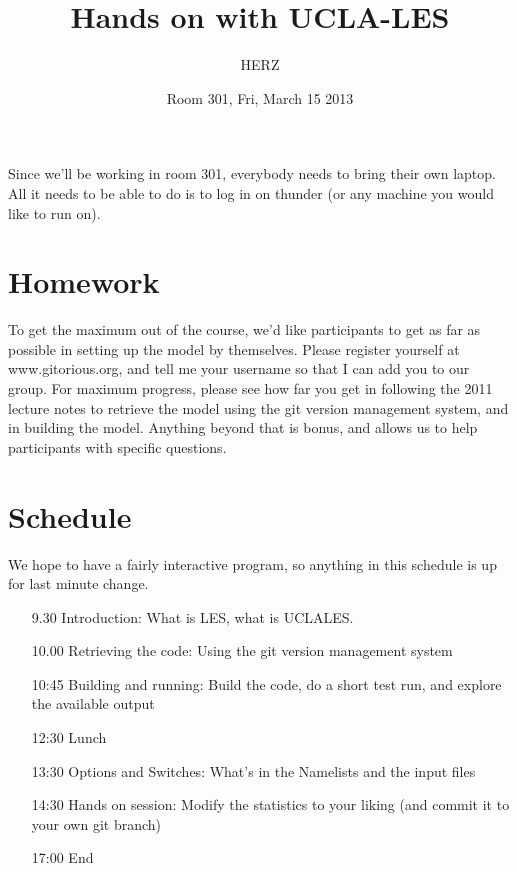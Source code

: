 \documentclass[a4paper,10pt]{article}
\title{Hands on with UCLA-LES}
\author{HERZ}
\date{Room 301, Fri, March 15 2013}
\begin{document}
\maketitle
Since we'll be working in room 301, everybody needs to bring their own laptop. All it needs to be able to do is to log in on thunder (or any machine you would like to run on).

\section*{Homework}
To get the maximum out of the course, we'd like participants to get as far as possible in setting up the model by themselves. Please register yourself at www.gitorious.org, and tell me your username so that I can add you to our group. For maximum progress, please see how far you get in following the 2011 lecture notes to retrieve the model using the git version management system, and in building the model. Anything beyond that is bonus, and allows us to help participants with specific questions.

\section*{Schedule}
We hope to have a fairly interactive program, so anything in this schedule is up for last minute change.
\begin{itemize}
 \item[9.30] Introduction: What is LES, what is UCLALES.
 \item[10.00] Retrieving the code: Using the git version management system
 \item[10:45] Building and running: Build the code, do a short test run, and explore the available output
 \item[12:30] Lunch
 \item[13:30] Options and Switches: What's in the Namelists and the input files
 \item[14:30] Hands on session: Modify the statistics to your liking (and commit it to your own git branch)
 \item[17:00] End
\end{itemize}
\end{document}
